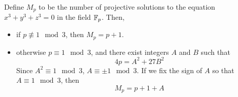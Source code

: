 %

\begin{theorem}
Define $M_p$ to be the number of projective solutions to the equation $x^3 + y^3 + z^3 = 0$ in the field $\mathbb{F}_p$.
Then,
\begin{itemize}
\item if $p \not\equiv 1 \mod{3}$, then $M_p = p + 1$.
\item otherwise $p \equiv 1 \mod{3}$, and there exist integers $A$ and $B$ such that
	$$4p = A^2 + 27B^2$$
	Since $A^2 \equiv 1 \mod{3}$, $A \equiv \pm1 \mod{3}$.
	If we fix the sign of $A$ so that $A \equiv 1 \mod{3}$, then
	$$M_p = p + 1 + A$$
\end{itemize}
\end{theorem}

